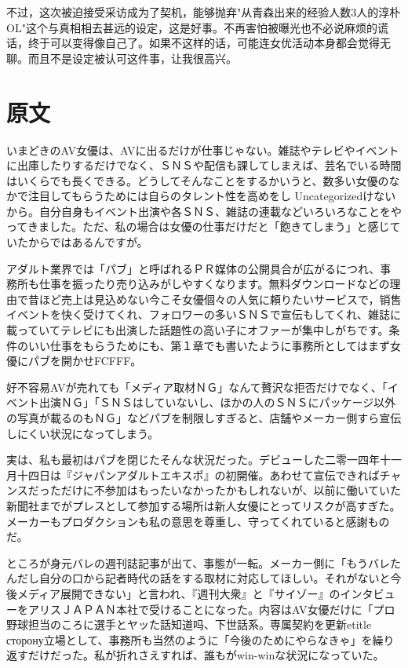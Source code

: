 \documentclass[12pt,UTF8]{ctexbook}
\begin{document}
不过，这次被迫接受采访成为了契机，能够抛弃"从青森出来的经验人数3人的淳朴OL"这个与真相相去甚远的设定，这是好事。不再害怕被曝光也不必说麻烦的谎话，终于可以变得像自己了。如果不这样的话，可能连女优活动本身都会觉得无聊。而且不是设定被认可这件事，让我很高兴。

\switchcolumn

\section*{原文}

いまどきのAV女優は、AVに出るだけが仕事じゃない。雑誌やテレビやイベントに出庫したりするだけでなく、ＳＮＳや配信も課してしまえば、芸名でいる時間はいくらでも長くできる。どうしてそんなことをするかいうと、数多い女優のなかで注目してもらうためには自らのタレント性を高めをし Uncategorizedけないから。自分自身もイベント出演や各ＳＮＳ、雑誌の連載などいろいろなことをやってきました。ただ、私の場合は女優の仕事だけだと「飽きてしまう」と感じていたからではあるんですが。

アダルト業界では「パブ」と呼ばれるＰＲ媒体の公開具合が広がるにつれ、事務所も仕事を振ったり売り込みがしやすくなります。無料ダウンロードなどの理由で昔ほど売上は見込めない今こそ女優個々の人気に頼りたいサービスで，销售イベントを快く受けてくれ、フォロワーの多いＳＮＳで宣伝もしてくれ、雑誌に載っていてテレビにも出演した話題性の高い子にオファーが集中しがちです。条件のいい仕事をもらうためにも、第１章でも書いたように事務所としてはまず女優にパブを開かせFCFFF。

好不容易AVが売れても「メディア取材ＮＧ」なんて贅沢な拒否だけでなく、「イベント出演ＮＧ」「ＳＮＳはしていないし、ほかの人のＳＮＳにパッケージ以外の写真が載るのもＮＧ」などパブを制限しすぎると、店舗やメーカー側すら宣伝しにくい状況になってしまう。

実は、私も最初はパブを閉じたそんな状況だった。デビューした二零一四年十一月十四日は『ジャパンアダルトエキスポ』の初開催。あわせて宣伝できればチャンスだっただけに不参加はもったいなかったかもしれないが、以前に働いていた新聞社までがプレスとして参加する場所は新人女優にとってリスクが高すぎた。メーカーもプロダクションも私の意思を尊重し、守ってくれていると感謝ものだ。

ところが身元バレの週刊誌記事が出て、事態が一転。メーカー側に「もうバレたんだし自分の口から記者時代の話をする取材に対応してほしい。それがないと今後メディア展開できない」と言われ、『週刊大衆』と『サイゾー』のインタビューをアリスＪＡＰＡＮ本社で受けることになった。内容はAV女優だけに「プロ野球担当のころに選手とヤッた話知道吗、下世話系。専属契約を更新etitle сторону立場として、事務所も当然のように「今後のためにやらなきゃ」を繰り返すだけだった。私が折れさえすれば、誰もがwin-winな状況になっていた。
\end{document}
